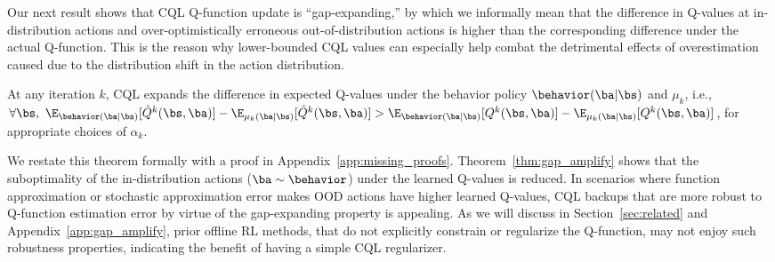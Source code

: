 Our next result shows that CQL Q-function update is ``gap-expanding,'' by which we informally mean that the difference in Q-values at in-distribution actions and over-optimistically erroneous out-of-distribution actions is higher than the corresponding difference under the actual Q-function. This is the reason why lower-bounded CQL values can especially help combat the detrimental effects of overestimation caused due to the distribution shift in the action distribution.
\begin{theorem} 
\label{thm:gap_amplify}
At any iteration $k$, CQL expands the difference in expected Q-values under the behavior policy $\behavior(\ba|\bs)$ and $\mu_k$, i.e., $\forall \bs, ~\E_{\behavior(\ba|\bs)}[\hat{Q}^k(\bs, \ba)] - \E_{\mu_k(\ba|\bs)}[\hat{Q}^k(\bs, \ba)] > \E_{\behavior(\ba|\bs)}[{Q}^k(\bs, \ba)] - \E_{\mu_k(\ba|\bs)}[{Q}^k(\bs, \ba)]$, for appropriate choices of $\alpha_k$.
\end{theorem}
We restate this theorem formally with a proof in Appendix~\ref{app:missing_proofs}. Theorem~\ref{thm:gap_amplify} shows that the suboptimality of the in-distribution actions ($\ba \sim \behavior$) under the learned Q-values is reduced. In scenarios where function approximation or stochastic approximation error makes OOD actions have higher learned Q-values, CQL backups that are more robust to Q-function estimation error by virtue of the gap-expanding property is appealing. 
As we will discuss in Section~\ref{sec:related} and Appendix~\ref{app:gap_amplify}, prior offline RL methods, that do not explicitly constrain or regularize the Q-function, may not enjoy such robustness properties, indicating the benefit of having a simple CQL regularizer. 

\vspace{-7pt}
